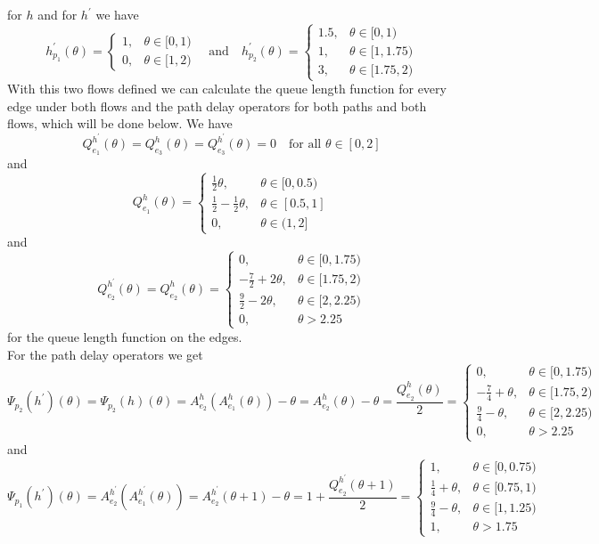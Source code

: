 \documentclass[reqno,openany]{amsbook}
\theoremstyle{definition}
\theoremstyle{plain}
\begin{document}
for $h$ and for $h^{\prime}$ we have 
\[h_{p_1}^{\prime}(\theta) = \begin{cases} 1,& \theta \in [0, 1) \\ 0,& \theta \in [1, 2) \end{cases} \quad \text{and} \quad h_{p_2}^{\prime}(\theta) = \begin{cases} 1.5,& \theta \in [0, 1) \\ 1,& \theta \in [1, 1.75) \\ 3,& \theta \in [1.75, 2) \end{cases} \]
With this two flows defined we can calculate the queue length function for every edge under both flows and the path delay operators for both paths and both flows, which will be done below.
We have 
\[Q_{e_1}^{h^{\prime}}(\theta) = Q_{e_3}^h(\theta) = Q_{e_3}^{h^{\prime}}(\theta) = 0 \quad \text{for all $\theta \in [0, 2]$}\]
and
\[Q_{e_1}^h(\theta) = \begin{cases} \frac{1}{2}\theta,& \theta \in [0, 0.5) \\ \frac{1}{2} - \frac{1}{2}\theta,& \theta \in [0.5, 1]\\ 0,& \theta \in (1, 2] \end{cases} \]
and 
\[Q_{e_2}^{h^{\prime}}(\theta) = Q_{e_2}^h(\theta) = \begin{cases} 0,& \theta \in [0, 1.75) \\ -\frac{7}{2} + 2\theta,& \theta \in [1.75, 2) \\ \frac{9}{2} - 2\theta,& \theta \in [2, 2.25) \\ 0,& \theta > 2.25 \end{cases}  \]
for the queue length function on the edges. \\
For the path delay operators we get 
\[ \Psi_{p_2}(h^{\prime})(\theta) = \Psi_{p_2}(h)(\theta) = A_{e_2}^h(A_{e_1}^h(\theta)) - \theta = A_{e_2}^h(\theta) - \theta =
\frac{Q_{e_2}^h(\theta)}{2} = \begin{cases} 0,& \theta \in [0, 1.75) \\ -\frac{7}{4} + \theta,& \theta \in [1.75, 2) \\ \frac{9}{4} - \theta,& \theta \in [2, 2.25) \\ 0,& \theta > 2.25 \end{cases}  \]
and 
\[\Psi_{p_1}(h^{\prime})(\theta) = A_{e_2}^{h^{\prime}}(A_{e_1}^{h^{\prime}}(\theta)) = A_{e_2}^{h^{\prime}}(\theta + 1) - \theta = 1 + \frac{Q_{e_2}^{h^{\prime}}(\theta + 1)}{2} = \begin{cases} 1,& \theta \in [0, 0.75) \\ \frac{1}{4} + \theta,& \theta \in [0.75, 1) \\ \frac{9}{4} - \theta,& \theta \in [1, 1.25) \\ 1,& \theta > 1.75 \end{cases} \]
\end{document}
